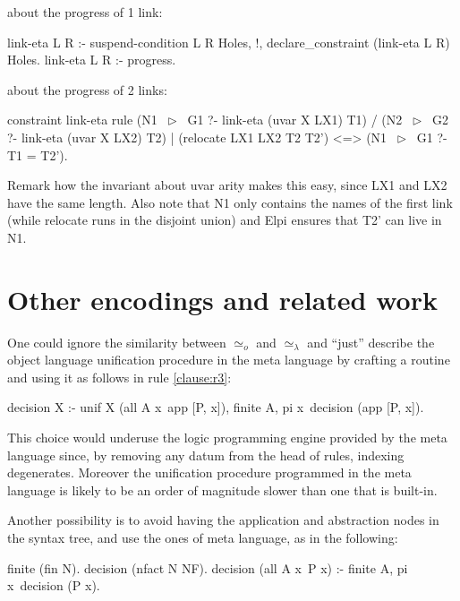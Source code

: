 \documentclass[sigconf,natbib=false,review]{acmart}
\newcommand{\UnifRel}{\ensuremath{\simeq}}
\newcommand{\Uo}{\ensuremath{\UnifRel_o}\xspace}
\newcommand{\Ue}{\ensuremath{\UnifRel_\lambda}\xspace}
\begin{document}
about the progress of 1 link:

\begin{elpicode}
link-eta L R :- suspend-condition L R Holes, !,
  declare_constraint (link-eta L R) Holes.
link-eta L R :-
  progress. %
\end{elpicode}

about the progress of 2 links:

\begin{elpicode}
constraint link-eta {
  rule (N1 ~$\triangleright$~ G1 ?- link-eta (uvar X LX1) T1) %
    /  (N2 ~$\triangleright$~ G2 ?- link-eta (uvar X LX2) T2) %
    |  (relocate LX1 LX2 T2 T2')             %
   <=> (N1 ~$\triangleright$~ G1 ?- T1 = T2').                %
}
\end{elpicode}

Remark how the invariant about uvar arity makes this easy, since LX1 and LX2
have the same length. Also note that N1 only contains the names of the first
link (while relocate runs in the disjoint union) and Elpi ensures that
T2' can live in N1.


\section{Other encodings and related work}\label{sec:encodings}

\noindent
One could ignore the similarity between \Uo{} and \Ue{} and ``just''
describe the object language unification procedure in the meta language by
crafting a  routine and using it as follows in
rule \ref{clause:r3}:

\begin{elpicode}
decision X :- unif X (all A x\ app [P, x]), finite A,
  pi x\ decision (app [P, x]).
\end{elpicode}

\noindent
This choice would underuse the logic programming engine provided by
the meta language since, by removing any datum from the head of rules,
indexing degenerates. Moreover the unification procedure 
programmed in the meta language is likely to be an order of magnitude
slower than one that is built-in.

Another possibility is to avoid having the application and abstraction nodes
in the syntax tree, and use the ones of meta language, as in the following:

\begin{elpicode}
finite (fin N).
decision (nfact N NF).
decision (all A x\ P x) :- finite A, pi x\ decision (P x).
\end{elpicode}
\end{document}
